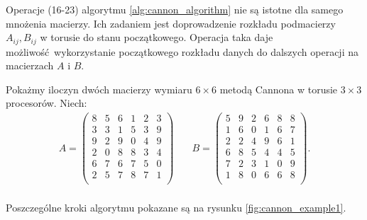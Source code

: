 Operacje (16-23) algorytmu \ref{alg:cannon_algorithm} nie są istotne dla samego mnożenia macierzy. Ich zadaniem jest doprowadzenie rozkładu podmacierzy \(A_{ij}, B_{ij}\) w torusie do stanu początkowego. Operacja taka daje możliwość wykorzystanie początkowego rozkładu danych do dalszych operacji na macierzach \(A\) i \(B\).
\clearpage
\begin{przyklad}
Pokażmy iloczyn dwóch macierzy wymiaru \(6 \times 6\) metodą Cannona w torusie \(3\times 3\) procesorów. Niech:
\begin{align*}
A=
\begin{pmatrix}
        8 & 5 & 6 & 1 & 2 & 3 \\
        3 & 3 & 1 & 5 & 3 & 9 \\ 
        9 & 2 & 9 & 0 & 4 & 9 \\ 
        2 & 0 & 8 & 8 & 3 & 4 \\ 
        6 & 7 & 6 & 7 & 5 & 0 \\ 
        2 & 5 & 7 & 8 & 7 & 1 \\
\end{pmatrix} & \quad 
B=
\begin{pmatrix}
        5 & 9 & 2 & 6 & 8 & 8 \\
        1 & 6 & 0 & 1 & 6 & 7 \\ 
        2 & 2 & 4 & 9 & 6 & 1 \\ 
        6 & 8 & 5 & 4 & 4 & 5 \\ 
        7 & 2 & 3 & 1 & 0 & 9 \\ 
        1 & 8 & 0 & 6 & 6 & 8 \\
\end{pmatrix}.\\
\end{align*}


\noindent Poszczególne kroki algorytmu pokazane są na rysunku \ref{fig:cannon_example1}.



\end{przyklad}
